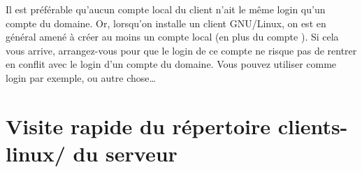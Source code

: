 \begin{alerte}
Il est préférable qu'aucun compte local du client n'ait le même
login qu'un compte du domaine. Or, lorsqu'on installe un client 
GNU/Linux, on est en général amené à créer au moins un compte local
(en plus du compte ).
Si cela vous arrive, arrangez-vous pour que le login de ce
compte ne risque pas de rentrer en conflit avec le login d'un
compte du domaine. 
Vous pouvez utiliser  comme login par exemple,
ou autre chose\ldots
\end{alerte}



\section{Visite rapide du répertoire clients-linux/ du serveur}
\label{arborescence}

